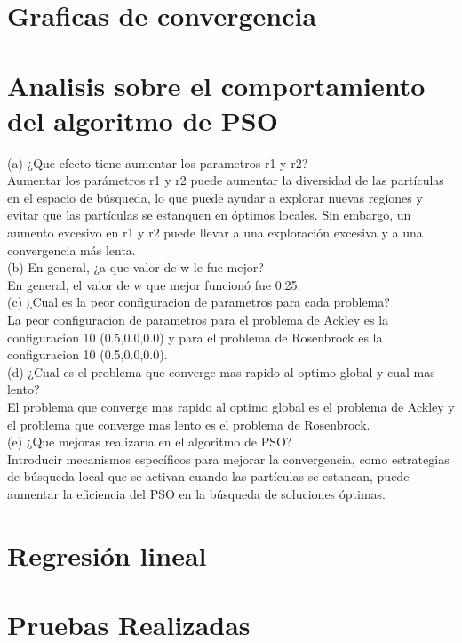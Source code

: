 \documentclass{report}
\begin{document}
    \section{Graficas de convergencia}

    \section{Analisis sobre el comportamiento del algoritmo de PSO}
    (a)  ¿Que efecto tiene aumentar los parametros r1 y r2?\\
    Aumentar los parámetros r1 y r2 puede aumentar la diversidad de las partículas en el espacio de búsqueda, lo que puede ayudar a explorar nuevas regiones y evitar que las partículas se estanquen en óptimos locales. Sin embargo, un aumento excesivo en r1 y r2 puede llevar a una exploración excesiva y a una convergencia más lenta.\\
    (b)  En general, ¿a que valor de w le fue mejor?\\
    En general, el valor de w que mejor funcionó fue 0.25.\\
    (c)  ¿Cual es la peor configuracion de parametros para cada problema?\\
    La peor configuracion de parametros para el problema de Ackley es la configuracion 10 (0.5,0.0,0.0) y para el problema de Rosenbrock es la configuracion 10 (0.5,0.0,0.0).\\
    (d)  ¿Cual es el problema que converge mas rapido al optimo global y cual mas lento?\\
    El problema que converge mas rapido al optimo global es el problema de Ackley y el problema que converge mas lento es el problema de Rosenbrock.\\
    (e)  ¿Que mejoras realizarıa en el algoritmo de PSO?\\ 
    Introducir mecanismos específicos para mejorar la convergencia, como estrategias de búsqueda local que se activan cuando las partículas se estancan, puede aumentar la eficiencia del PSO en la búsqueda de soluciones óptimas.  

    \section{Regresión lineal}
    

    \section{Pruebas Realizadas}
\end{document}
